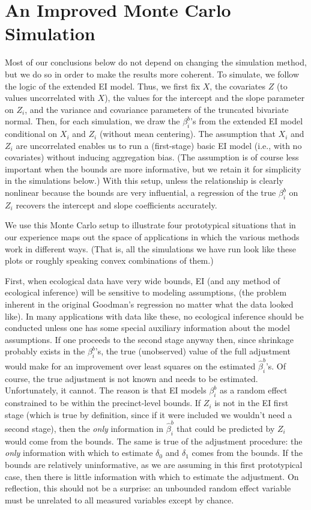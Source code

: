 \documentclass[11pt,titlepage]{article}
\begin{document}
\section{An Improved Monte Carlo Simulation} \label{s:alt}

Most of our conclusions below do not depend on changing the simulation
method, but we do so in order to make the results more coherent.  To
simulate, we follow the logic of the extended EI model.  Thus, we
first fix $X$, the covariates $Z$ (to values uncorrelated with $X$),
the values for the intercept and the slope parameter on $Z_i$, and the
variance and covariance parameters of the truncated bivariate normal.
Then, for each simulation, we draw the $\beta_i^b$'s from the extended
EI model conditional on $X_i$ and $Z_i$ (without mean centering).  The
assumption that $X_i$ and $Z_i$ are uncorrelated enables us to run a
(first-stage) basic EI model (i.e., with no covariates) without
inducing aggregation bias.  (The assumption is of course less
important when the bounds are more informative, but we retain it for
simplicity in the simulations below.)  With this setup, unless the
relationship is clearly nonlinear because the bounds are very
influential, a regression of the true $\beta_i^b$ on $Z_i$ recovers
the intercept and slope coefficients accurately.

We use this Monte Carlo setup to illustrate four prototypical
situations that in our experience maps out the space of applications
in which the various methods work in different ways.  (That is, all
the simulations we have run look like these plots or roughly speaking
convex combinations of them.)

First, when ecological data have very wide bounds, EI (and any method
of ecological inference) will be sensitive to modeling assumptions,
(the problem inherent in the original Goodman's regression no matter
what the data looked like).  In many applications with data like
these, no ecological inference should be conducted unless one has some
special auxiliary information about the model assumptions.  If one
proceeds to the second stage anyway then, since shrinkage probably
exists in the $\beta_i^b$'s, the true (unobserved) value of the full
adjustment would make for an improvement over least squares on the
estimated $\hat\beta_i^b$'s.  Of course, the true adjustment is not
known and needs to be estimated.  Unfortunately, it cannot.  The
reason is that EI models $\beta_i^b$ as a random effect constrained to
be within the precinct-level bounds.  If $Z_i$ is not in the EI first
stage (which is true by definition, since if it were included we
wouldn't need a second stage), then the \emph{only} information in
$\hat\beta_i^b$ that could be predicted by $Z_i$ would come from the
bounds.  The same is true of the adjustment procedure: the \emph{only}
information with which to estimate $\delta_0$ and $\delta_1$ comes
from the bounds.  If the bounds are relatively uninformative, as we
are assuming in this first prototypical case, then there is little
information with which to estimate the adjustment.  On reflection,
this should not be a surprise: an unbounded random effect variable
must be unrelated to all measured variables except by chance.
\end{document}
